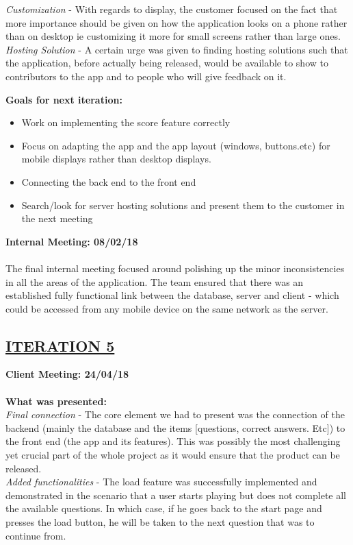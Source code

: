 \documentclass[paper=a4,fontsize=11pt]{article}
\newcommand{\sepspace}{\vspace*{1em}}		%
\newcommand{\SectionPart}[1]{\subsection*{\uppercase{#1}}}
\begin{document}
\noindent
\textit{Customization} -
With regards to display, the customer focused on the fact that more importance should be
given on how the application looks on a phone rather than on desktop ie customizing it more
for small screens rather than large ones.\\

\noindent
\textit{Hosting Solution} -
A certain urge was given to finding hosting solutions such that the application, before
actually being released, would be available to show to contributors to the app and to people
who will give feedback on it.\\
\sepspace

\noindent
\textbf{Goals for next iteration:}
\begin{itemize}
	\item Work on implementing the score feature correctly
	\item Focus on adapting the app and the app layout (windows, buttons.etc) for mobile displays rather than desktop displays.
	\item Connecting the back end to the front end
	\item Search/look for server hosting solutions and present them to the customer in the next meeting
\end{itemize}
\sepspace

\hfill \textbf{Internal Meeting: 08/02/18}\\
\\
\noindent
The final internal meeting focused around polishing up the minor inconsistencies in all the
areas of the application. The team ensured that there was an established fully functional link between
the database, server and client - which could be accessed from any mobile device on the same network
as the server.\\
\sepspace

\SectionPart{\ul{Iteration 5}}
\hfill \textbf{Client Meeting: 24/04/18} \\
\\
\textbf{What was presented:}\\
\noindent
\textit{Final connection} -
The core element we had to present was the connection of the backend (mainly the database
and the items [questions, correct answers. Etc]) to the front end (the app and its features).
This was possibly the most challenging yet crucial part of the whole project as it would
ensure that the product can be released.\\

\noindent
\textit{Added functionalities} -
The load feature was successfully implemented and demonstrated in the scenario that a user
starts playing but does not complete all the available questions. In which case, if he goes back
to the start page and presses the load button, he will be taken to the next question that was to
continue from.\\
\sepspace
\end{document}
